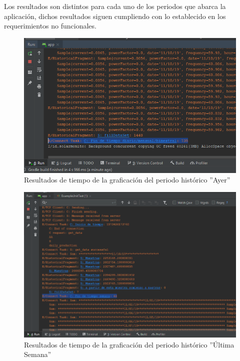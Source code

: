 Los resultados son distintos para cada uno de los periodos que abarca la aplicación, dichos resultados siguen cumpliendo con lo establecido en los requerimientos no funcionales.\\ \newline

\begin{figure}[H]
	\centering
	\includegraphics[scale=.6]{Capitulo5/images/TiempoGraficacionAyer.png}
	\caption{Resultados de tiempo de la graficación del periodo histórico ''Ayer''}	\label{fig:Tiempo_GraficacionHAyer}
\end{figure} 
\begin{figure}[H]
	\centering
	\includegraphics[scale=.6]{Capitulo5/images/TiempoGraficacionUltimaSemana.png}
	\caption{Resultados de tiempo de la graficación del periodo histórico ''Última Semana''}	\label{fig:Tiempo_GraficacionHUltimaSemana}
\end{figure} 
